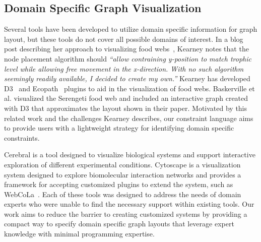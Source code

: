 
\subsection{Domain Specific Graph Visualization}
 Several tools have been developed to utilize
domain specific information for graph layout, but these tools do not cover
all possible domains of interest. In a blog post describing her approach to
visualizing food webs~\cite{kearney2016blog}, Kearney notes that the node
placement algorithm should \emph{``allow contraining y-position to match
  trophic level while allowing free movement in the x-direction. With no
  such algorithm seemingly readily available, I decided to create my
  own.''} Kearney has developed D3~\cite{kearney2017d3} and
Ecopath~\cite{kearney2017ecopath} plugins to aid in the visualization of
food webs. Baskerville et al. \cite{baskerville2011spatial} visualized the
Serengeti food web and included an interactive graph
\cite{baskerville2011interactive} created with D3 that approximates the
layout shown in their paper. Motivated by this related work and the
challenges Kearney describes, our constraint language aims to provide users
with a lightweight strategy for identifying domain specific constraints.

Cerebral \cite{barsky2008cerebral} is a tool designed to visualize
biological systems and support interactive exploration of different
experimental conditions. Cytoscape \cite{shannon2003cytoscape} is a
visualization system designed to explore biomolecular interaction networks
and provides a framework for accepting customized plugins to extend the
system, such as WebCoLa~\cite{WebCoLa}. Each of these tools was designed to
address the needs of domain experts who were unable to find the necessary
support within existing tools. Our work aims to reduce the barrier to
creating customized systems by providing a compact way to specify domain
specific graph layouts that leverage expert knowledge with minimal
programming expertise.





